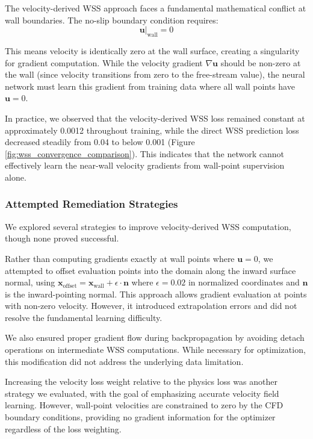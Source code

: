 \documentclass[12pt,a4paper]{article}
\begin{document}
The velocity-derived WSS approach faces a fundamental mathematical conflict at wall boundaries. The no-slip boundary condition requires:
\begin{equation}
    \mathbf{u}|_{\text{wall}} = 0
\end{equation}

This means velocity is identically zero at the wall surface, creating a singularity for gradient computation. While the velocity gradient $\nabla \mathbf{u}$ should be non-zero at the wall (since velocity transitions from zero to the free-stream value), the neural network must learn this gradient from training data where all wall points have $\mathbf{u} = 0$.

In practice, we observed that the velocity-derived WSS loss remained constant at approximately 0.0012 throughout training, while the direct WSS prediction loss decreased steadily from 0.04 to below 0.001 (Figure \ref{fig:wss_convergence_comparison}). This indicates that the network cannot effectively learn the near-wall velocity gradients from wall-point supervision alone.

\subsubsection{Attempted Remediation Strategies}

We explored several strategies to improve velocity-derived WSS computation, though none proved successful.

Rather than computing gradients exactly at wall points where $\mathbf{u} = 0$, we attempted to offset evaluation points into the domain along the inward surface normal, using $\mathbf{x}_{\text{offset}} = \mathbf{x}_{\text{wall}} + \epsilon \cdot \mathbf{n}$ where $\epsilon = 0.02$ in normalized coordinates and $\mathbf{n}$ is the inward-pointing normal. This approach allows gradient evaluation at points with non-zero velocity. However, it introduced extrapolation errors and did not resolve the fundamental learning difficulty.

We also ensured proper gradient flow during backpropagation by avoiding detach operations on intermediate WSS computations. While necessary for optimization, this modification did not address the underlying data limitation.

Increasing the velocity loss weight relative to the physics loss was another strategy we evaluated, with the goal of emphasizing accurate velocity field learning. However, wall-point velocities are constrained to zero by the CFD boundary conditions, providing no gradient information for the optimizer regardless of the loss weighting.
\end{document}
